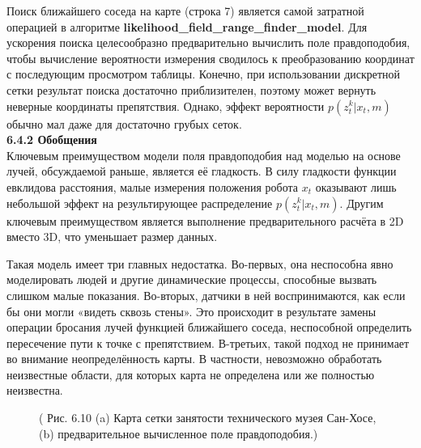 \documentclass[10pt,a4paper]{article}
\begin{document}
Поиск ближайшего соседа на карте (строка 7) является самой затратной операцией в алгоритме \textbf{likelihood\_field\_range\_finder\_model}. Для ускорения поиска целесообразно предварительно вычислить поле правдоподобия, чтобы вычисление вероятности измерения сводилось к преобразованию координат с последующим просмотром таблицы. Конечно, при использовании дискретной сетки результат поиска достаточно приблизителен, поэтому может вернуть неверные координаты препятствия. Однако, эффект вероятности $p(z_t^k | x_t, m)$ обычно мал даже для достаточно грубых сеток.\\ 

\textbf{6.4.2 Обобщения}\\

Ключевым преимуществом модели поля правдоподобия над моделью на основе лучей, обсуждаемой раньше, является её гладкость. В силу гладкости функции евклидова расстояния, малые измерения положения робота $x_t$ оказывают лишь небольшой эффект на результирующее распределение $p(z_t^k | x_t, m)$. Другим ключевым преимуществом является выполнение предварительного расчёта в 2D вместо 3D, что уменьшает размер данных.

Такая модель имеет три главных недостатка. Во-первых, она неспособна явно моделировать людей и другие динамические процессы, способные вызвать слишком малые показания. 
Во-вторых, датчики в ней воспринимаются, как если бы они могли «видеть сквозь стены». Это происходит в результате замены операции бросания лучей функцией ближайшего соседа, неспособной определить пересечение пути к точке с препятствием. В-третьих, такой подход не принимает во внимание неопределённость карты. В частности, невозможно обработать неизвестные области, для которых карта не определена или же полностью неизвестна.

\begin{figure}[H]
	\caption{ (  Рис. 6.10 (a) Карта сетки занятости технического музея Сан-Хосе, (b) предварительное вычисленное поле правдоподобия.)}
	\label{fig:610orig}
\end{figure}
\end{document}
